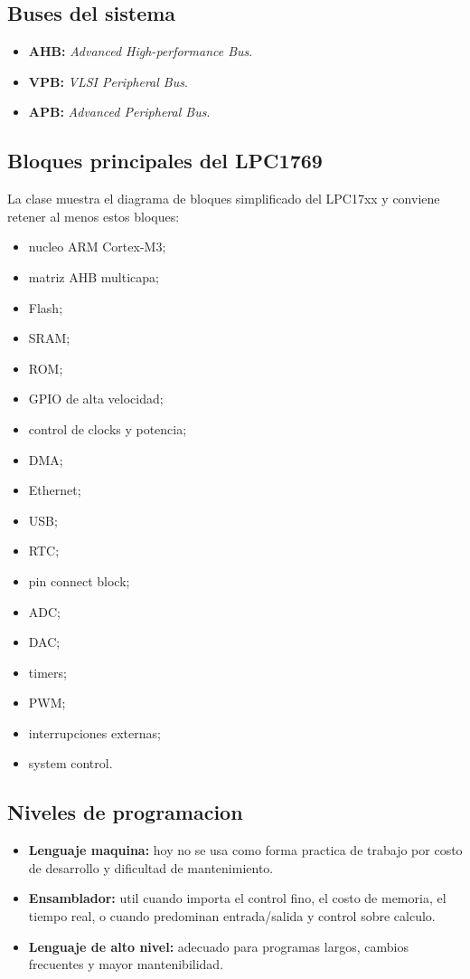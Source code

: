 \subsection{Buses del sistema}

\begin{itemize}
  \item \textbf{AHB:} \textit{Advanced High-performance Bus}.
  \item \textbf{VPB:} \textit{VLSI Peripheral Bus}.
  \item \textbf{APB:} \textit{Advanced Peripheral Bus}.
\end{itemize}

\subsection{Bloques principales del LPC1769}

La clase muestra el diagrama de bloques simplificado del LPC17xx y conviene retener al menos estos bloques:

\begin{itemize}
  \item nucleo ARM Cortex-M3;
  \item matriz AHB multicapa;
  \item Flash;
  \item SRAM;
  \item ROM;
  \item GPIO de alta velocidad;
  \item control de clocks y potencia;
  \item DMA;
  \item Ethernet;
  \item USB;
  \item RTC;
  \item pin connect block;
  \item ADC;
  \item DAC;
  \item timers;
  \item PWM;
  \item interrupciones externas;
  \item system control.
\end{itemize}

\subsection{Niveles de programacion}

\begin{itemize}
  \item \textbf{Lenguaje maquina:} hoy no se usa como forma practica de trabajo por costo de desarrollo y dificultad de mantenimiento.
  \item \textbf{Ensamblador:} util cuando importa el control fino, el costo de memoria, el tiempo real, o cuando predominan entrada/salida y control sobre calculo.
  \item \textbf{Lenguaje de alto nivel:} adecuado para programas largos, cambios frecuentes y mayor mantenibilidad.
\end{itemize}

